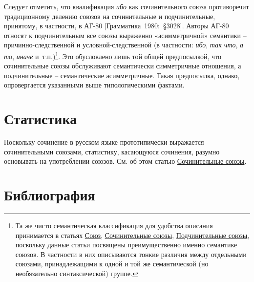 Следует отметить, что квалификация \emph{ибо} как сочинительного союза
противоречит традиционному делению союзов на сочинительные и
подчинительные, принятому, в частности, в АГ-80
{[}Грамматика~1980:~§3028{]}. Авторы АГ-80 относят к подчинительным все
союзы выраженно «асимметричной» семантики -- причинно-следственной и
условной-следственной (в частности: \emph{ибо}, \emph{так что}, \emph{а
то}, \emph{иначе} и~т.п.)\footnote{Та же чисто семантическая
  классификация для удобства описания принимается в статьях
  \underline{Союз}, \underline{Сочинительные союзы},
  \underline{Подчинительные союзы}, поскольку данные статьи посвящены
  преимущественно именно семантике союзов. В частности в них описываются
  тонкие различия между отдельными союзами, принадлежащими к одной и той
  же семантической (но необязательно синтаксической) группе.}. Это
обусловлено лишь той общей предпосылкой, что сочинительные союзы
обслуживают семантически симметричные отношения, а подчинительные --
семантические асимметричные. Такая предпосылка, однако, опровергается
указанными выше типологическими фактами.

\hypertarget{ux441ux442ux430ux442ux438ux441ux442ux438ux43aux430}{%
\section{Статистика}\label{ux441ux442ux430ux442ux438ux441ux442ux438ux43aux430}}

Поскольку сочинение в русском языке прототипически выражается
сочинительными союзами, статистику, касающуюся сочинения, разумно
основывать на употреблении союзов. См. об этом статью
\underline{Сочинительные союзы}.

\hypertarget{ux431ux438ux431ux43bux438ux43eux433ux440ux430ux444ux438ux44f}{%
\section{Библиография}\label{ux431ux438ux431ux43bux438ux43eux433ux440ux430ux444ux438ux44f}}


